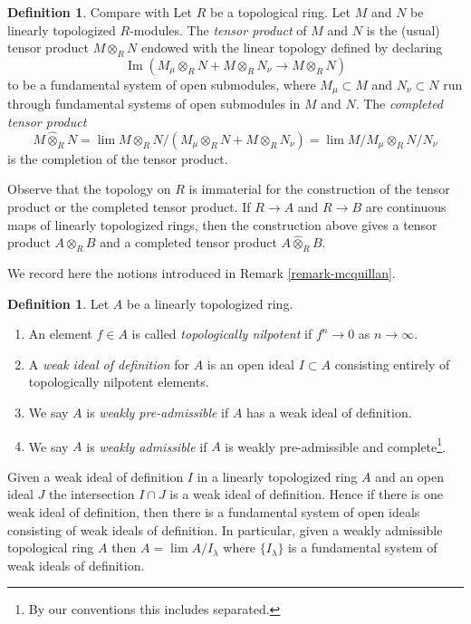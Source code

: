 \documentclass{stacks-project}
\newenvironment{reference}{\comment}{\endcomment}
\theoremstyle{plain}
\theoremstyle{definition}
\newtheorem{definition}[subsection]{Definition}
\theoremstyle{remark}
\numberwithin{equation}{subsection}
\def\lim{\mathop{\mathrm{lim}}\nolimits}
\def\Im{\mathop{\mathrm{Im}}}
\begin{document}
\begin{definition}
\label{definition-toplogy-tensor-product}
\begin{reference}
Compare with \cite[0, Section 7.7]{EGA}
\end{reference}
Let $R$ be a topological ring. Let $M$ and $N$ be linearly
topologized $R$-modules. The {\it tensor product} of $M$ and $N$
is the (usual) tensor product $M \otimes_R N$ endowed
with the linear topology defined by declaring
$$
\Im(M_\mu \otimes_R N + M \otimes_R N_\nu \longrightarrow M \otimes_R N)
$$
to be a fundamental system of open submodules, where
$M_\mu \subset M$ and $N_\nu \subset N$ run through fundamental
systems of open submodules in $M$ and $N$.
The {\it completed tensor product}
$$
M \widehat{\otimes}_R N =
\lim M \otimes_R N/(M_\mu \otimes_R N + M \otimes_R N_\nu) =
\lim M/M_\mu \otimes_R N/N_\nu
$$
is the completion of the tensor product.
\end{definition}

\noindent
Observe that the topology on $R$ is immaterial for the construction
of the tensor product or the completed tensor product.
If $R \to A$ and $R \to B$ are continuous maps of
linearly topologized rings, then the construction above
gives a tensor product $A \otimes_R B$ and a completed
tensor product $A \widehat{\otimes}_R B$.

\medskip\noindent
We record here the notions introduced in Remark \ref{remark-mcquillan}.

\begin{definition}
\label{definition-weakly-admissible}
Let $A$ be a linearly topologized ring.
\begin{enumerate}
\item An element $f \in A$ is called {\it topologically nilpotent}
if $f^n \to 0$ as $n \to \infty$.
\item A {\it weak ideal of definition} for $A$ is an open ideal
$I \subset A$ consisting entirely of topologically nilpotent elements.
\item We say $A$ is {\it weakly pre-admissible} if $A$ has a weak
ideal of definition.
\item We say $A$ is {\it weakly admissible} if $A$ is weakly pre-admissible
and complete\footnote{By our conventions this includes separated.}.
\end{enumerate}
\end{definition}

\noindent
Given a weak ideal of definition $I$ in a linearly topologized ring
$A$ and an open ideal $J$ the intersection $I \cap J$ is a
weak ideal of definition. Hence if there is one weak ideal of definition,
then there is a fundamental system of open ideals
consisting of weak ideals of definition. In particular,
given a weakly admissible topological ring $A$ then
$A = \lim A/I_\lambda$ where $\{I_\lambda\}$ is a fundamental system
of weak ideals of definition.
\end{document}

